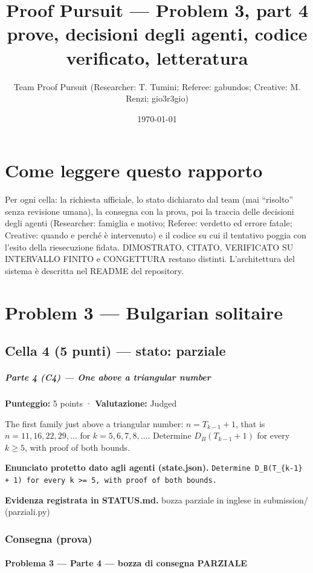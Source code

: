 \documentclass[11pt,a4paper]{article}
\title{Proof Pursuit --- Problem 3, part 4\\ \large prove, decisioni degli agenti, codice verificato, letteratura}
\author{Team Proof Pursuit (Researcher: T. Tumini; Referee: gabundos; Creative: M. Renzi; gio3r3gio)}
\date{\today}
\begin{document}
\maketitle\tableofcontents
\section*{Come leggere questo rapporto}
Per ogni cella: la richiesta ufficiale, lo stato dichiarato dal team (mai ``risolto'' senza revisione umana), la consegna
con la prova, poi la traccia delle decisioni degli agenti (Researcher: famiglia e motivo; Referee: verdetto ed errore
fatale; Creative: quando e perché è intervenuto) e il codice su cui il tentativo poggia con l'esito della riesecuzione
fidata. DIMOSTRATO, CITATO, VERIFICATO SU INTERVALLO FINITO e CONGETTURA restano distinti. L'architettura del sistema
è descritta nel README del repository.
\section{Problem 3 — Bulgarian solitaire}
\subsection{Cella 4 (5 punti) — stato: parziale}
\subparagraph{Parte 4 (C4) --- One above a triangular
number}\label{parte-4-c4-one-above-a-triangular-number}

\textbf{Punteggio:} 5 points · \textbf{Valutazione:} Judged

The first family just above a triangular number: \(n = T_{k-1} + 1\),
that is \(n = 11, 16, 22, 29, \ldots\) for \(k = 5, 6, 7, 8, \ldots\).
Determine \(D_B(T_{k-1} + 1)\) for every \(k \ge 5\), with proof of both
bounds.

\textbf{Enunciato protetto dato agli agenti (state.json).} \texttt{Determine D\_B(T\_\{k-1\} + 1) for every k \textgreater{}= 5, with proof of both bounds.}

\textbf{Evidenza registrata in STATUS.md.} bozza parziale in inglese in submission/ (parziali.py)

\subsubsection{Consegna (prova)}
\paragraph{Problema 3 --- Parte 4 --- bozza di consegna
PARZIALE}\label{problema-3-parte-4-bozza-di-consegna-parziale}
\end{document}
